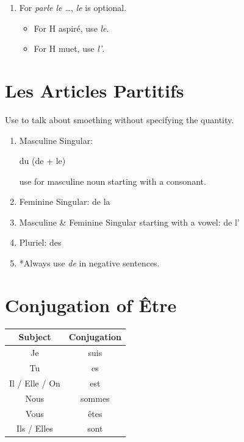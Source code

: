 \documentclass{book}
\begin{document}
\begin{enumerate}
            \begin{center}
                Je me brosse les cheveux (I brush my hair) \\
                Il s'est cassé le bras (He broke his arm)
            \end{center}
            \item For \textit{parle le \dots}, \textit{le} is optional.
            \begin{itemize}
                \item For H aspiré, use \textit{le}.
                \item For H muet, use \textit{l'}.
            \end{itemize}
        \end{enumerate}

    \section{Les Articles Partitifs}
        Use to talk about smoething without specifying the quantity.
        \begin{enumerate}
            \item Masculine Singular: 
            \begin{center}
                du (de + le)
            \end{center}
            use for masculine noun starting with a consonant.
            \item Feminine Singular: de la
            \item Masculine \& Feminine Singular starting with a vowel: de l'
            \item Pluriel: des
            \item *Always use \textit{de} in negative sentences.
        \end{enumerate}

    \section{Conjugation of Être}
        \begin{center}
            \begin{tabular}{|c|c|}
                \hline
                \textbf{Subject} & \textbf{Conjugation}\\
                \hline
                Je & suis\\
                \hline
                Tu & es\\
                \hline
                Il / Elle / On & est\\  
                \hline
                Nous & sommes\\
                \hline
                Vous & êtes\\
                \hline
                Ils / Elles & sont\\
                \hline
            \end{tabular}
        \end{center}
\end{document}
